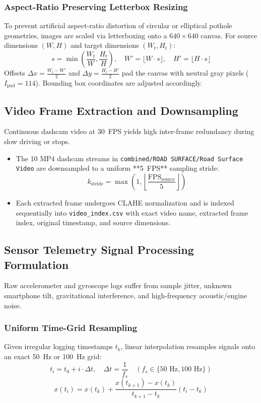 \documentclass[11pt,a4paper]{article}
\begin{document}
\subsubsection{Aspect-Ratio Preserving Letterbox Resizing}
To prevent artificial aspect-ratio distortion of circular or elliptical pothole geometries, images are scaled via letterboxing onto a $640\times640$ canvas. For source dimensions $(W, H)$ and target dimensions $(W_t, H_t)$:
\begin{equation}
s = \min\left(\frac{W_t}{W}, \frac{H_t}{H}\right), \quad W' = \lfloor W \cdot s \rfloor, \quad H' = \lfloor H \cdot s \rfloor
\end{equation}
Offsets $\Delta x = \frac{W_t - W'}{2}$ and $\Delta y = \frac{H_t - H'}{2}$ pad the canvas with neutral gray pixels ($I_{\text{pad}} = 114$). Bounding box coordinates are adjusted accordingly.

\subsection{Video Frame Extraction and Downsampling}
Continuous dashcam video at 30~FPS yields high inter-frame redundancy during slow driving or stops. 
\begin{itemize}
    \item The 10 MP4 dashcam streams in \texttt{combined/ROAD SURFACE/Road Surface Video} are downsampled to a uniform **5~FPS** sampling stride:
    \begin{equation}
    k_{\text{stride}} = \max\left(1, \left\lfloor \frac{\text{FPS}_{\text{source}}}{5} \right\rfloor\right)
    \end{equation}
    \item Each extracted frame undergoes CLAHE normalization and is indexed sequentially into \texttt{video\_index.csv} with exact video name, extracted frame index, original timestamp, and source dimensions.
\end{itemize}

\subsection{Sensor Telemetry Signal Processing Formulation}
Raw accelerometer and gyroscope logs suffer from sample jitter, unknown smartphone tilt, gravitational interference, and high-frequency acoustic/engine noise.

\subsubsection{Uniform Time-Grid Resampling}
Given irregular logging timestamps $t_k$, linear interpolation resamples signals onto an exact 50~Hz or 100~Hz grid:
\begin{equation}
t_i = t_0 + i \cdot \Delta t, \quad \Delta t = \frac{1}{f_s} \quad (f_s \in \{50\text{ Hz}, 100\text{ Hz}\})
\end{equation}
\begin{equation}
x(t_i) = x(t_k) + \frac{x(t_{k+1}) - x(t_k)}{t_{k+1} - t_k} (t_i - t_k)
\end{equation}
\end{document}
